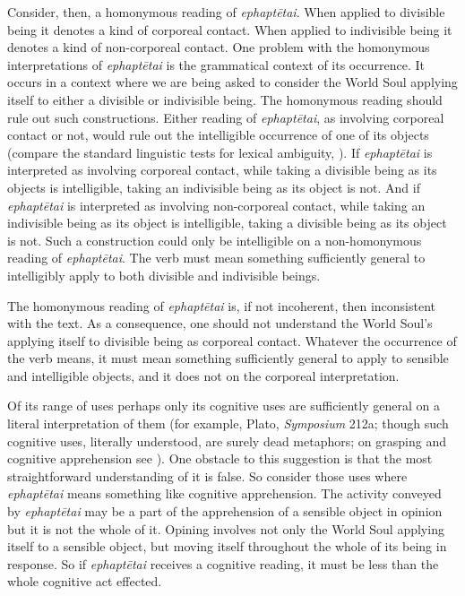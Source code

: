 Consider, then, a homonymous reading of \emph{ephaptētai}. When applied to divisible being it denotes a kind of corporeal contact. When applied to indivisible being it denotes a kind of non-corporeal contact. One problem with the homonymous interpretations of \emph{ephaptētai} is the grammatical context of its occurrence. It occurs in a context where we are being asked to consider the World Soul applying itself to either a divisible or indivisible being. The homonymous reading should rule out such constructions. Either reading of \emph{ephaptētai}, as involving corporeal contact or not, would rule out the intelligible occurrence of one of its objects  (compare the standard linguistic tests for lexical ambiguity, \citealt{Zwicky:1975hl}). If \emph{ephaptētai} is interpreted as involving corporeal contact, while taking a divisible being as its objects is intelligible, taking an indivisible being as its object is not. And if \emph{ephaptētai} is interpreted as involving non-corporeal contact, while taking an indivisible being as its object is intelligible, taking a divisible being as its object is not. Such a construction could only be intelligible on a non-homonymous reading of \emph{ephaptētai}. The verb must mean something sufficiently general to intelligibly apply to both divisible and indivisible beings.

The homonymous reading of \emph{ephaptētai} is, if not incoherent, then inconsistent with the text. As a consequence, one should not understand the World Soul's applying itself to divisible being as corporeal contact. Whatever the occurrence of the verb means, it must mean something sufficiently general to apply to sensible and intelligible objects, and it does not on the corporeal interpretation. 

Of its range of uses perhaps only its cognitive uses are sufficiently general on a literal interpretation of them (for example, Plato, \emph{Symposium} 212a; though such cognitive uses, literally understood, are surely dead metaphors; on grasping and cognitive apprehension see \citealt{Rosen:1961aa}). One obstacle to this suggestion is that the most straightforward understanding of it is false. So consider those uses where \emph{ephaptētai} means something like cognitive apprehension. The activity conveyed by \emph{ephaptētai} may be a part of the apprehension of a sensible object in opinion but it is not the whole of it. Opining involves not only the World Soul applying itself to a sensible object, but moving itself throughout the whole of its being in response. So if \emph{ephaptētai} receives a cognitive reading, it must be less than the whole cognitive act effected. 

